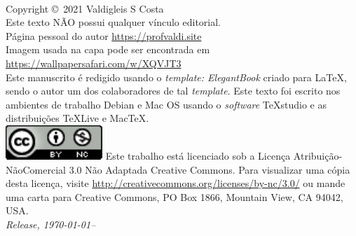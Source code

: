 \newpage
~\vfill
\thispagestyle{empty}

\noindent Copyright \copyright\ 2021 Valdigleis S Costa\\ %

\noindent Este texto  \textsc{NÃO}  possui qualquer vínculo editorial.\\ %

\noindent Página pessoal do autor \url{https://profvaldi.site}\\ 

\noindent Imagem usada na capa pode ser encontrada em \url{https://wallpapersafari.com/w/XQVJT3}\\

\noindent Este manuscrito é redigido usando o \textit{template: 	ElegantBook} criado para \LaTeX, sendo o autor um dos colaboradores de tal \textit{template}. Este texto foi escrito nos ambientes de trabalho Debian e Mac OS usando o \textit{software} TeXstudio e as distribuições TeXLive e MacTeX. \\ 

\noindent \includegraphics[width=0.09\linewidth]{figure/license.pdf}  Este trabalho está licenciado sob a Licença Atribuição-NãoComercial 3.0 Não Adaptada Creative Commons. Para visualizar uma cópia desta licença, visite \url{http://creativecommons.org/licenses/by-nc/3.0/} ou mande uma carta para Creative Commons, PO Box 1866, Mountain View, CA 94042, USA.\\


\noindent \textit{Release, \today--\currenttime} %